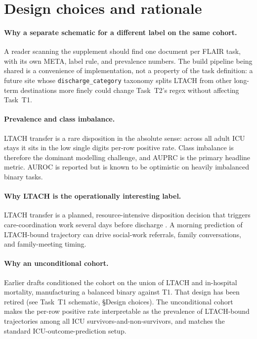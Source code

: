 \documentclass[11pt]{article}
\begin{document}
\section{Design choices and rationale}

\paragraph{Why a separate schematic for a different label on the same cohort.}
A reader scanning the supplement should find one document per FLAIR
task, with its own META, label rule, and prevalence numbers. The
build pipeline being shared is a convenience of implementation, not a
property of the task definition: a future site whose
\texttt{discharge\_category} taxonomy splits LTACH from other
long-term destinations more finely could change Task~T2's regex
without affecting Task~T1.

\paragraph{Prevalence and class imbalance.}
LTACH transfer is a rare disposition in the absolute sense: across
all adult ICU stays it sits in the low single digits per-row positive
rate. Class imbalance is therefore the dominant modelling challenge,
and AUPRC is the primary headline metric. AUROC is reported but is
known to be optimistic on heavily imbalanced binary tasks.

\paragraph{Why LTACH is the operationally interesting label.}
LTACH transfer is a planned, resource-intensive disposition decision
that triggers care-coordination work several days before discharge
\citep{kahn2010ltach}. A morning prediction of LTACH-bound trajectory
can drive social-work referrals, family conversations, and
family-meeting timing.

\paragraph{Why an unconditional cohort.}
Earlier drafts conditioned the cohort on the union of LTACH and
in-hospital mortality, manufacturing a balanced binary against T1.
That design has been retired (see Task~T1 schematic, \S Design
choices). The unconditional cohort makes the per-row positive rate
interpretable as the prevalence of LTACH-bound trajectories among all
ICU survivors-and-non-survivors, and matches the standard
ICU-outcome-prediction setup.
\end{document}
